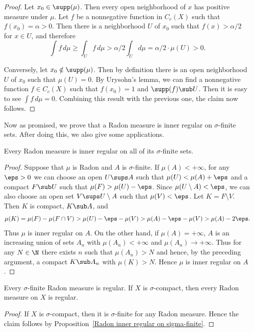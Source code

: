 \begin{proof}
Let $x_0\in\supp(\mu)$. Then every open neighborhood of $x$ has positive measure under $\mu$. Let $f$ be a nonnegative function in $C_c(X)$ such that $f(x_0)=\alpha>0$. Then there is a neighborhood $U$ of $x_0$ such that $f(x)>\alpha/2$ for $x\in U$, and therefore
\[\int f\,d\mu\geq\int_Uf\,d\mu>\alpha/2\int_Ud\mu=\alpha/2\cdot\mu(U)>0.\]

Conversely, let $x_0\notin\supp(\mu)$. Then by definition there is an open neighborhood $U$ of $x_0$ such that $\mu(U)=0$. By Urysohn's lemma, we can find a nonnegative function $f\in C_c(X)$ such that $f(x_0)=1$ and $\supp(f)\sub U$. Then it is easy to see $\int f\,d\mu=0$. Combining this result with the previous one, the claim now follows.
\end{proof}
Now as promised, we prove that a Radon measure is inner regular on $\sigma$-finite sets. After doing this, we also give some applications.
\begin{proposition}\label{Radon inner regular on sigma-finite}
Every Radon measure is inner regular on all of its $\sigma$-finite sets.
\end{proposition}
\begin{proof}
Suppose that $\mu$ is Radon and $A$ is $\sigma$-finite. If $\mu(A)<+\infty$, for any $\eps>0$ we can choose an open $U\sups A$ such that $\mu(U)<\mu(A)+\eps$ and a compact $F\sub U$ such that $\mu(F)>\mu(U)-\eps$. Since $\mu(U\setminus A)<\eps$, we can also choose an open set $V\sups U\setminus A$ such that $\mu(V)<\eps$. Let $K=F\setminus V$. Then $K$ is compact, $K\sub A$, and
\[\mu(K)=\mu(F)-\mu(F\cap V)>\mu(U)-\eps-\mu(V)>\mu(A)-\eps-\mu(V)>\mu(A)-2\eps.\]
Thus $\mu$ is inner regular on $A$. On the other hand, if $\mu(A)=+\infty$, $A$ is an increasing union of sets $A_n$ with $\mu(A_n)<+\infty$ and $\mu(A_n)\to+\infty$. Thus for any $N\in\N$ there exists $n$ such that $\mu(A_n)>N$ and hence, by the preceding argument, a compact $K\sub A_n$ with $\mu(K)>N$. Hence $\mu$ is inner regular on $A$.
\end{proof}
\begin{corollary}\label{sigma-finite Radon or sigma-compact space is regular}
Every $\sigma$-finite Radon measure is regular. If $X$ is $\sigma$-compact, then every Radon measure on $X$ is regular.
\end{corollary}
\begin{proof}
If $X$ is $\sigma$-compact, then it is $\sigma$-finite for any Radon measure. Hence the claim follows by Proposition~\ref{Radon inner regular on sigma-finite}.
\end{proof}
